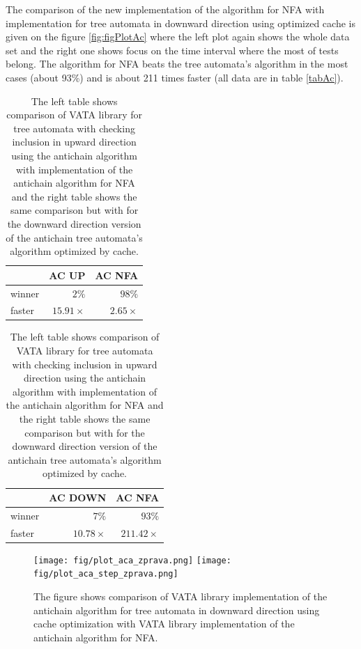 The comparison of the new implementation of the algorithm for NFA with implementation for tree automata in downward direction using optimized cache
is given on the figure 
\ref{fig:figPlotAc} where the left plot again shows the whole data set and the right one shows focus on the time interval where the most of tests belong.
The algorithm for NFA beats the tree automata's algorithm in the most cases (about 93\%) and is about 211 times faster (all data are in table \ref{tabAc}).

\begin{table}[bt]
\begin{center}
\parbox{.45\linewidth}{
  \begin{tabular}[scale=0.3]{ | l | r | r |}
   \hline
    & \textbf{AC UP} & \textbf{AC NFA} \\ \hline \hline
    winner & $2\%$ & $98\%$ \\ \hline
    faster & $15.91\times$ & $2.65\times$ \\ \hline
   \end{tabular}
}
   \parbox{.45\linewidth}{
  \begin{tabular}{ | l | r | r |}
   \hline
    & \textbf{AC DOWN} & \textbf{AC NFA} \\ \hline \hline
    winner & $7\%$ & $93\%$ \\ \hline
    faster & $10.78\times$ & $211.42\times$ \\ \hline
   \end{tabular}
   }
   \caption{The left table shows comparison of VATA library for tree automata with checking inclusion in upward direction using the antichain algorithm with
       implementation of the antichain algorithm for NFA and
   the right table shows the same comparison but with for the downward direction version of the antichain tree automata's algorithm optimized
   by cache.}
   \label{tabAac}
\end{center}
\end{table}



\begin{figure}[bt]
\begin{center}
\texttt{[image: fig/plot\_aca\_zprava.png]}
\texttt{[image: fig/plot\_aca\_step\_zprava.png]}
\caption{The figure shows
 comparison of VATA library implementation of the antichain algorithm for tree automata in downward direction using cache optimization 
 with VATA library implementation of the antichain algorithm for NFA.}
\label{fig:figPlotAca}
\end{center}
\end{figure}

